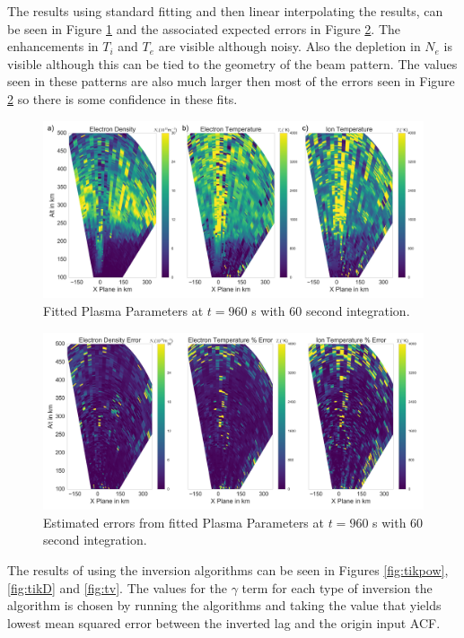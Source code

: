 The results using standard fitting and then linear interpolating the results, can be seen in Figure \ref{fig:fplparamst60inv} and the associated expected errors in Figure \ref{fig:fplparamst60errinv}. The enhancements in $T_i$ and $T_e$ are visible although noisy. Also the depletion in $N_e$ is visible although this can be tied to the geometry of the beam pattern. The values seen in these patterns are also much larger then most of the errors seen in Figure \ref{fig:fplparamst60errinv} so there is some confidence in these fits.

\begin{figure}[!ht]
\centering
\includegraphics[width=6in]{0960_60_int}
\caption{Fitted Plasma Parameters at $t=960$ s with 60 second integration.}
\label{fig:fplparamst60inv}
\end{figure}

\begin{figure}[!ht]
\centering
\includegraphics[width=6in]{0960_60_int_err}
\caption{Estimated errors from fitted Plasma Parameters at $t=960$ s with 60 second integration.}
\label{fig:fplparamst60errinv}
\end{figure}

The results of using the inversion algorithms can be seen in Figures \ref{fig:tikpow}, \ref{fig:tikD} and \ref{fig:tv}. The values for the $\gamma$ term for each type of inversion the algorithm is chosen by running the algorithms and taking the value that yields lowest mean squared error between the inverted lag and the origin input ACF. 

